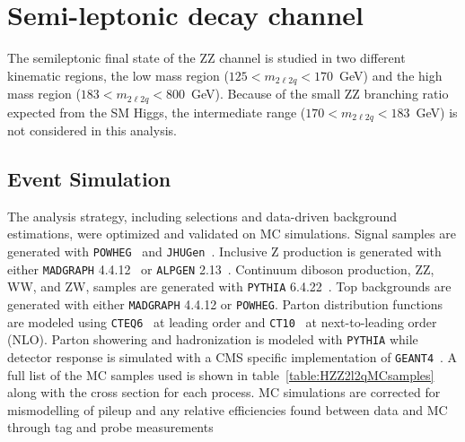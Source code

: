 
\section{Semi-leptonic decay channel}
\label{sec:HZZ2l2q}

The semileptonic final state of the ZZ channel is studied in two 
different kinematic regions, the low mass region 
($125 < m_{2\ell2q} < 170$~GeV) and the high mass region 
($183 < m_{2\ell2q} < 800$~GeV).  Because of the small ZZ branching ratio
expected from the SM Higgs, the intermediate range 
($170 < m_{2\ell2q} < 183$~GeV) is not considered in this analysis.

\subsection{Event Simulation}
\label{sec:HZZ2l2qSimulation}

The analysis strategy, including selections and data-driven
background estimations, were optimized and validated on MC
simulations.  Signal samples are generated with
{\verb+POWHEG+}~\cite{Nason:2004rx,Frixione:2007vw,Alioli:2008gx} and {\verb+JHUGen+}~\cite{Gao:2010qx}.  
Inclusive Z production is generated with either {\verb+MADGRAPH+}
4.4.12~\cite{Alwall:2007st} or {\verb+ALPGEN+} 2.13~\cite{Mangano:2002ea}.  Continuum
diboson production, ZZ, WW, and ZW, samples are generated with
{\verb+PYTHIA+} 6.4.22~\cite{Sjostrand:2006za}.  Top backgrounds are generated
with either {\verb+MADGRAPH+} 4.4.12 or {\verb+POWHEG+}.  Parton
distribution functions are modeled using {\verb+CTEQ6+}~\cite{Kretzer:2003it}
at leading order and {\verb+CT10+}~\cite{Lai:2010vv} at next-to-leading
order (NLO).  Parton showering and hadronization is modeled with
{\verb+PYTHIA+} while detector response is simulated with a CMS
specific implementation of {\verb+GEANT4+}~\cite{Agostinelli:2002hh}.  A full
list of the MC samples used is shown in
table~\ref{table:HZZ2l2qMCsamples} along with the cross section
for each process.  MC simulations are corrected for mismodelling
of pileup and any relative efficiencies found between data and
MC through tag and probe measurements

